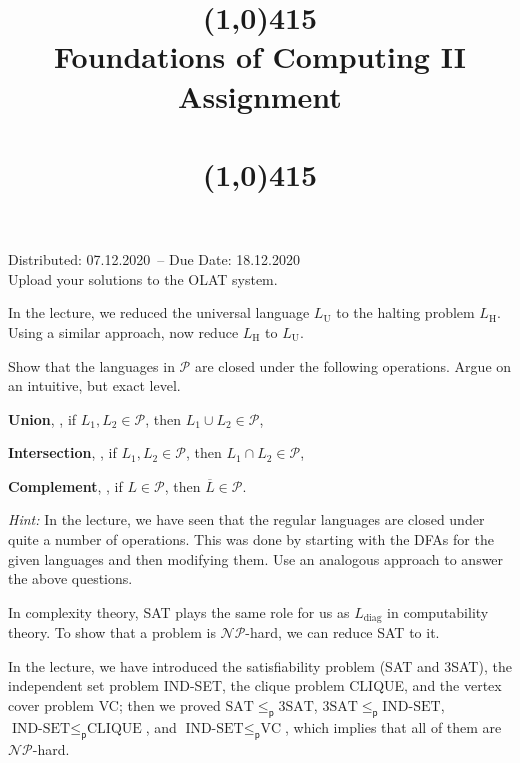 \documentclass{exercise}
\title{\line(1,0){415}\\
  Foundations of Computing II\\
  \Large Assignment \theexercise\\[1em]
  \large{\topics}\\
  \line(1,0){415}}
\newcommand{\distdate}{07.12.2020}
\newcommand{\duedate}{18.12.2020}
\begin{document}
\maketitle

\begin{center}
  Distributed: \distdate\ -- Due Date: \duedate\\[1em]
  Upload your solutions to the OLAT system.\\[3em]
\end{center}


In the lecture, we reduced the universal language $L_{\text{U}}$ to the halting
problem $L_{\text{H}}$.  Using a similar approach, now reduce $L_{\text{H}}$
to $L_{\text{U}}$.




Show that the languages in $\mathcal{P}$ are closed under the following
operations.  Argue on an intuitive, but exact level.

\subtask \textbf{Union}, \ie, if $L_1,L_2\in\mathcal{P}$, then $L_1\cup L_2\in\mathcal{P}$,



\subtask \textbf{Intersection}, \ie, if $L_1,L_2\in\mathcal{P}$, then $L_1\cap L_2\in\mathcal{P}$,
  

\subtask \textbf{Complement}, \ie, if $L\in\mathcal{P}$, then $\overline{L}\in\mathcal{P}$.
  

\nosubtask

\textit{Hint:} In the lecture, we have seen that the regular languages are closed
  under quite a number of operations.  This was done by starting with the DFAs for
  the given languages and then modifying them.  Use an analogous approach to
  answer the above questions.


In complexity theory, SAT plays the same role for us as $L_{\text{diag}}$ in
computability theory.  To show that a problem is $\mathcal{NP}$-hard, we can
reduce SAT to it.

In the lecture, we have introduced the satisfiability problem (SAT and $3$SAT),
the independent set problem IND-SET, the clique problem CLIQUE, and the vertex
cover problem VC; then we proved $\text{SAT}\le_{\textsf{p}}3\text{SAT}$,
$3\text{SAT}\le_{\textsf{p}}\text{IND-SET}$, $\text{IND-SET}\le_{\textsf{p}}\text{CLIQUE}$,
and $\text{IND-SET}\le_{\textsf{p}}\text{VC}$, which implies that all of them
are $\mathcal{NP}$-hard.
\end{document}
